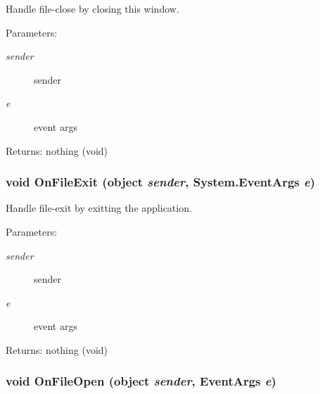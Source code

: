Handle file-close by closing this window. 

\begin{Desc}
\item[Parameters:]
\begin{description}
\item[{\em sender}]sender \item[{\em e}]event args \end{description}
\end{Desc}
\begin{Desc}
\item[Returns:]nothing (void) \end{Desc}
\subsubsection{\setlength{\rightskip}{0pt plus 5cm}void On\-File\-Exit (object {\em sender}, System.Event\-Args {\em e})\hspace{0.3cm}{\tt  [private]}}\label{class_c_s_image_viewer_1_1_c_s_image_viewer_077956e9f8880bb2a03bff4577f62ae5}


Handle file-exit by exitting the application. 

\begin{Desc}
\item[Parameters:]
\begin{description}
\item[{\em sender}]sender \item[{\em e}]event args \end{description}
\end{Desc}
\begin{Desc}
\item[Returns:]nothing (void) \end{Desc}
\subsubsection{\setlength{\rightskip}{0pt plus 5cm}void On\-File\-Open (object {\em sender}, Event\-Args {\em e})\hspace{0.3cm}{\tt  [private]}}\label{class_c_s_image_viewer_1_1_c_s_image_viewer_6ff74b461ff2a4e9eaad7716f580639c}


